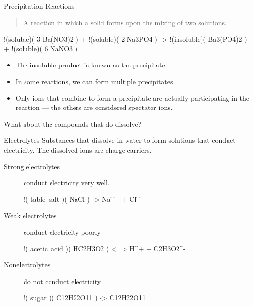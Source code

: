 \documentclass[notes=only]{beamer}
\begin{document}
\begin{frame}{Precipitation Reactions}
	\begin{quote}
		A reaction in which a solid forms upon the mixing of two
		solutions.
	\end{quote}
	\begin{reaction*}
		!(soluble)( 3 Ba(NO3)2\aq{} ) + !(soluble)( 2 Na3PO4\aq{} ) ->
		!(insoluble)( Ba3(PO4)2\sld{} ) + !(soluble)( 6
		NaNO3\aq{} )
	\end{reaction*}

	\begin{itemize}
		\item The \alert{insoluble} product is known as the
			\alert{precipitate}.
		\item In some reactions, we can form multiple precipitates.
		\item Only ions that combine to form a precipitate are actually
			participating in the reaction --- the others are
			considered \alert{spectator} ions.
	\end{itemize}
\end{frame}

%

\begin{frame}{What about the compounds that do dissolve?}
	\begin{block}{Electrolytes}
		Substances that dissolve in water to form solutions that conduct
		electricity. The dissolved ions are \alert{charge carriers}.
	\end{block}

	\pause

	\begin{description}
		\item[Strong electrolytes] conduct electricity \alert{very
	  well}.
	  \begin{reaction*}
	  	!( table~salt )( NaCl\sld{} ) -> Na^{+}\aq{} +
	  	Cl^{-}\aq{}
	  \end{reaction*}

	  \pause

  \item[Weak electrolytes] conduct electricity
	  \alert{poorly}.
	  \begin{reaction*}
	  	!( acetic~acid )( HC2H3O2\aq{} ) <=> H^{+}\aq{}
	  	+ C2H3O2^{-}\aq{}
	  \end{reaction*}

	  \pause

	\item[Nonelectrolytes] do not conduct electricity.
	\begin{reaction*}
		!( sugar )( C12H22O11\sld{} ) ->
		C12H22O11\aq{}
	\end{reaction*}
\end{description}
\end{frame}
\end{document}
